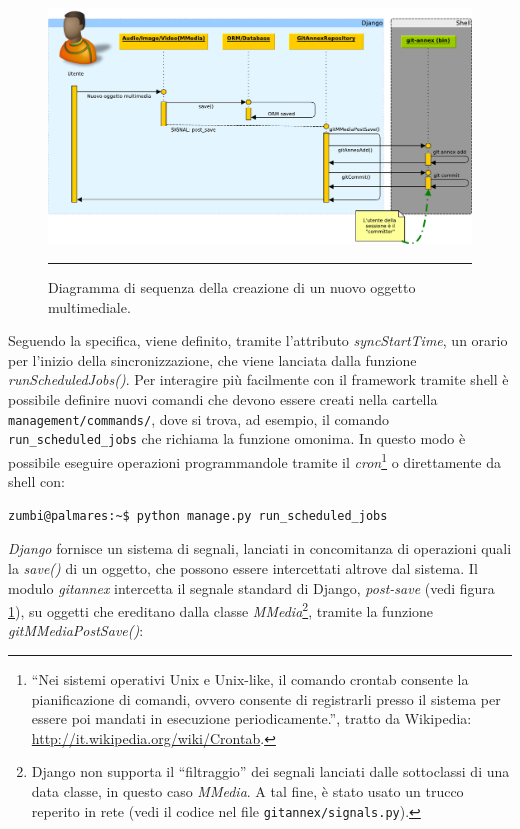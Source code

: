 \begin{figure}[htbp]
  \centering
  \includegraphics[width=\textwidth]{./Figure/SequenceDiagram_NuovoOggetto-crop.pdf}
  \rule{35em}{0.5pt}
  \caption[Diagramma di sequenza della creazione di un nuovo oggetto
  multimediale]{Diagramma di sequenza della creazione di un nuovo
    oggetto multimediale.}
  \label{fig:SequenceDiagramAdd}
\end{figure}

Seguendo la specifica, viene definito, tramite l'attributo
\emph{syncStartTime}, un orario per l'inizio della sincronizzazione,
che viene lanciata dalla funzione \emph{runScheduledJobs()}. Per
interagire più facilmente con il framework tramite shell è possibile
definire nuovi comandi che devono essere creati nella cartella
\verb|management/commands/|, dove si trova, ad esempio, il comando
\verb|run_scheduled_jobs| che richiama la funzione omonima. In questo
modo è possibile eseguire operazioni programmandole tramite il
\emph{cron}\footnote{``Nei sistemi operativi Unix e Unix-like, il
  comando crontab consente la pianificazione di comandi, ovvero
  consente di registrarli presso il sistema per essere poi mandati in
  esecuzione periodicamente.'', tratto da Wikipedia:
  \url{http://it.wikipedia.org/wiki/Crontab}.} o direttamente da shell
con:
\begin{verbatim}
zumbi@palmares:~$ python manage.py run_scheduled_jobs
\end{verbatim}

\emph{Django} fornisce un sistema di segnali, lanciati in concomitanza di
operazioni quali la \emph{save()} di un oggetto, che possono essere
intercettati altrove dal sistema. Il modulo \emph{gitannex} intercetta
il segnale standard di Django, \emph{post-save} (vedi figura
\ref{fig:SequenceDiagramAdd}), su oggetti che ereditano dalla classe
\emph{MMedia}\footnote{Django non supporta il ``filtraggio'' dei
  segnali lanciati dalle sottoclassi di una data classe, in questo
  caso \emph{MMedia}. A tal fine, è stato usato un trucco reperito in
  rete (vedi il codice nel file \texttt{gitannex/signals.py}).},
tramite la funzione \emph{gitMMediaPostSave()}:

